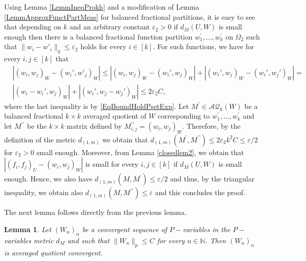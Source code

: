 \documentclass[11pt]{article}
\newtheorem{lemma}[theorem]{Lemma}
\def\N{\mathbb{N}}
\begin{document}
Using Lemma \ref{LemmIneqProkh} and a modification of Lemma \ref{LemmApproxFunctPartMeas} for balanced fractional partitions, it is easy to see that depending on $k$ and an arbitrary constant $\varepsilon_2>0$ if $d_M(U,W)$ is small enough then there is a balanced fractional function partition $w_1^{\prime},\ldots,w_k^{\prime}$ on $\Omega_2$ such that $\|w_i-w'_i\|_{q}\leq\varepsilon_2$ holds for every $i\in [k].$ For such functions, we have for every $i,j\in [k]$ that 
$$\begin{aligned}&|(w_i,w_j)_W-(w_i',w'_j)_W|\leq |(w_i,w_j)_W-(w_i',w_j)_W|+|(w_i',w_j)_W-(w_i',w_j')_W|=\\
&|(w_i-w_i',w_j)_W|+|(w_i',w_j-w_j')_W|\leq 2\varepsilon_2C,\end{aligned}$$
where the last inequality is by \eqref{EqBoundHoldPsetExp}. Let $M^{\prime }\in\mathcal{AQ}_k(W)$ be a balanced fractional $k\times k$ averaged quotient of $W$ corresponding to $w_1^{\prime},\ldots,w_k^{\prime}$ and let $M^{\prime \prime}$ be the $k\times k$ matrix defined by $M^{\prime \prime}_{i,j}=(w_i,w_j)_W$. Therefore, by the definition of the metric $d_{(1,m)}$ we obtain that $d_{(1,m)}(M^{\prime},M^{\prime \prime})\leq 2\varepsilon_2k^2C\leq\varepsilon/2$ for $\varepsilon_2>0$ small enough. Moreover, from Lemma \ref{closedlem2}, we obtain that $|(f_i,f_j)_U-(w_i,w_j)_W|$ is small for every $i,j\in [k]$ if $d_M(U,W)$ is small enough. Hence, we also have $d_{(1,m)}(M,M^{\prime})\leq\varepsilon/2$ and thus, by the triangular inequality, we obtain also $d_{(1,m)}(M,M^{\prime\prime})\leq\varepsilon$ and this concludes the proof.
\endproof

The next lemma follows directly from the previous lemma.

\begin{lemma}\label{quprop} Let $(W_n)_{n}$ be a convergent sequence of  $P-$variables in the $P-$variables metric $d_M$ and such that $\|W_n\|_{p}\leq C$ for every $n\in \N$. Then $(W_n)_{n}$ is averaged quotient convergent. 
\end{lemma}
\end{document}
